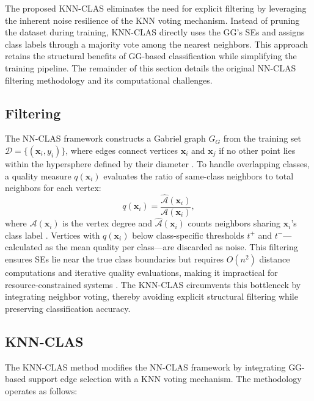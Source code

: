\documentclass[conference]{IEEEtran}
\begin{document}
The proposed KNN-CLAS eliminates the need for explicit filtering by leveraging the inherent noise resilience of the KNN voting mechanism. Instead of pruning the dataset during training, KNN-CLAS directly uses the GG's SEs and assigns class labels through a majority vote among the nearest neighbors. This approach retains the structural benefits of GG-based classification while simplifying the training pipeline. The remainder of this section details the original NN-CLAS filtering methodology and its computational challenges.

\subsection{Filtering}

The NN-CLAS framework constructs a Gabriel graph \( G_G \) from the training set \( \mathcal{D} = \{(\mathbf{x}_i, y_i)\} \), where edges connect vertices \( \mathbf{x}_i \) and \( \mathbf{x}_j \) if no other point lies within the hypersphere defined by their diameter \cite{torres2016}. To handle overlapping classes, a quality measure \( q(\mathbf{x}_i) \) evaluates the ratio of same-class neighbors to total neighbors for each vertex:
\[
q(\mathbf{x}_i) = \frac{\hat{\mathcal{A}}(\mathbf{x}_i)}{\mathcal{A}(\mathbf{x}_i)},
\]
where \( \mathcal{A}(\mathbf{x}_i) \) is the vertex degree and \( \hat{\mathcal{A}}(\mathbf{x}_i) \) counts neighbors sharing \( \mathbf{x}_i \)'s class label \cite{souza2019}. Vertices with \( q(\mathbf{x}_i) \) below class-specific thresholds \( t^+ \) and \( t^- \)—calculated as the mean quality per class—are discarded as noise. This filtering ensures SEs lie near the true class boundaries but requires \( O(n^2) \) distance computations and iterative quality evaluations, making it impractical for resource-constrained systems \cite{arias2021}. The KNN-CLAS circumvents this bottleneck by integrating neighbor voting, thereby avoiding explicit structural filtering while preserving classification accuracy.

\subsection{KNN-CLAS}
The KNN-CLAS method modifies the NN-CLAS framework by integrating GG-based support edge selection with a KNN voting mechanism. The methodology operates as follows:
\end{document}

